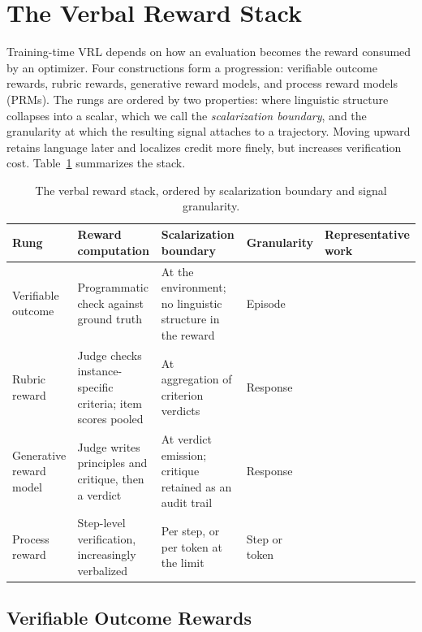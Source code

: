 \section{The Verbal Reward Stack}
\label{sec:rewardstack}

Training-time VRL depends on how an evaluation becomes the reward consumed by an optimizer. Four constructions form a progression: verifiable outcome rewards, rubric rewards, generative reward models, and process reward models (PRMs). The rungs are ordered by two properties: where linguistic structure collapses into a scalar, which we call the \emph{scalarization boundary}, and the granularity at which the resulting signal attaches to a trajectory. Moving upward retains language later and localizes credit more finely, but increases verification cost. Table~\ref{tab:rewardstack} summarizes the stack.

\begin{table}
\caption{The verbal reward stack, ordered by scalarization boundary and signal granularity.}
\label{tab:rewardstack}
\small
\begin{tabular}{@{}p{}p{}p{}p{}p{}@{}}
\toprule
Rung & Reward computation & Scalarization boundary & Granularity & Representative work \\
\midrule
Verifiable outcome & Programmatic check against ground truth & At the environment; no linguistic structure in the reward & Episode & \citep{lambert2024tulu,guo2025deepseek} \\
Rubric reward & Judge checks instance-specific criteria; item scores pooled & At aggregation of criterion verdicts & Response & \citep{gunjal2025rubrics,viswanathan2025checklists} \\
Generative reward model & Judge writes principles and critique, then a verdict & At verdict emission; critique retained as an audit trail & Response & \citep{zhang2025genrm,liu2025inferencetime} \\
Process reward & Step-level verification, increasingly verbalized & Per step, or per token at the limit & Step or token & \citep{wang2024mathshepherd,khalifa2025processrewardmodelsthink} \\
\bottomrule
\end{tabular}
\end{table}

\subsection{Verifiable Outcome Rewards}
\label{subsec:rlvr}

